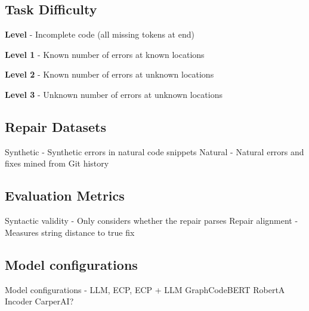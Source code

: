 \documentclass[sigplan,review,anonymous,acmsmall]{acmart}\settopmatter{printfolios=false,printccs=false,printacmref=false}
\begin{document}

    \subsection{Task Difficulty}

    \noindent\textbf{Level \textonehalf} - Incomplete code (all missing tokens at end)

    \noindent\textbf{Level 1} - Known number of errors at known locations

    \noindent\textbf{Level 2} - Known number of errors at unknown locations

    \noindent\textbf{Level 3} - Unknown number of errors at unknown locations

    \subsection{Repair Datasets}
    Synthetic - Synthetic errors in natural code snippets
    Natural - Natural errors and fixes mined from Git history
    \subsection{Evaluation Metrics}
    Syntactic validity - Only considers whether the repair parses
    Repair alignment - Measures string distance to true fix
    \subsection{Model configurations}
    Model configurations - LLM, ECP, ECP + LLM
    GraphCodeBERT
    RobertA
    Incoder
    CarperAI?
\end{document}
